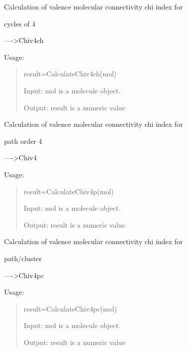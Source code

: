 \documentclass[letterpaper,10pt,english]{sphinxmanual}
\begin{document}

\begin{fulllineitems}
\label{reference/connectivity:connectivity.CalculateChiv4ch}
Calculation of valence molecular connectivity chi index for

cycles of 4

----\textgreater{}Chiv4ch

Usage:
\begin{quote}

result=CalculateChiv4ch(mol)

Input: mol is a molecule object.

Output: result is a numeric value
\end{quote}

\end{fulllineitems}


\begin{fulllineitems}
\label{reference/connectivity:connectivity.CalculateChiv4p}
Calculation of valence molecular connectivity chi index for

path order 4

----\textgreater{}Chiv4

Usage:
\begin{quote}

result=CalculateChiv4p(mol)

Input: mol is a molecule object.

Output: result is a numeric value
\end{quote}

\end{fulllineitems}


\begin{fulllineitems}
\label{reference/connectivity:connectivity.CalculateChiv4pc}
Calculation of valence molecular connectivity chi index for

path/cluster

----\textgreater{}Chiv4pc

Usage:
\begin{quote}

result=CalculateChiv4pc(mol)

Input: mol is a molecule object.

Output: result is a numeric value
\end{quote}

\end{fulllineitems}
\end{document}
